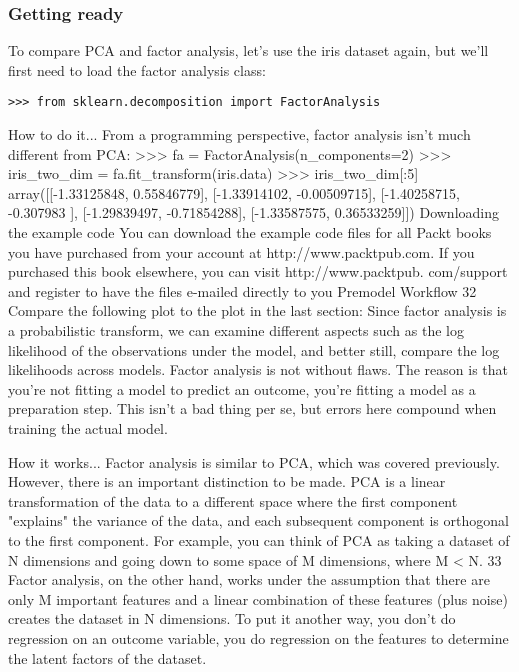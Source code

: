 \documentclass[SKL-MASTER.tex]{subfiles}
\begin{document}
\subsubsection{Getting ready}
To compare PCA and factor analysis, let's use the iris dataset again, but we'll first need to
load the factor analysis class:
\begin{framed}
\begin{verbatim}
>>> from sklearn.decomposition import FactorAnalysis
\end{verbatim}
\end{framed}
How to do it...
From a programming perspective, factor analysis isn't much different from PCA:
>>> fa = FactorAnalysis(n_components=2)
>>> iris_two_dim = fa.fit_transform(iris.data)
>>> iris_two_dim[:5]
array([[-1.33125848, 0.55846779],
[-1.33914102, -0.00509715],
[-1.40258715, -0.307983 ],
[-1.29839497, -0.71854288],
[-1.33587575, 0.36533259]])
Downloading the example code
You can download the example code files for all Packt books you have
purchased from your account at http://www.packtpub.com. If you
purchased this book elsewhere, you can visit http://www.packtpub.
com/support and register to have the files e-mailed directly to you
Premodel Workflow
32
Compare the following plot to the plot in the last section:
Since factor analysis is a probabilistic transform, we can examine different aspects such
as the log likelihood of the observations under the model, and better still, compare the log
likelihoods across models.
Factor analysis is not without flaws. The reason is that you're not fitting a model to predict
an outcome, you're fitting a model as a preparation step. This isn't a bad thing per se, but
errors here compound when training the actual model.

How it works...
Factor analysis is similar to PCA, which was covered previously. However, there is an important
distinction to be made. PCA is a linear transformation of the data to a different space where
the first component "explains" the variance of the data, and each subsequent component is
orthogonal to the first component.
For example, you can think of PCA as taking a dataset of N dimensions and going down to
some space of M dimensions, where M < N.
33
Factor analysis, on the other hand, works under the assumption that there are only M
important features and a linear combination of these features (plus noise) creates the
dataset in N dimensions. To put it another way, you don't do regression on an outcome
variable, you do regression on the features to determine the latent factors of the dataset.
\end{document}
